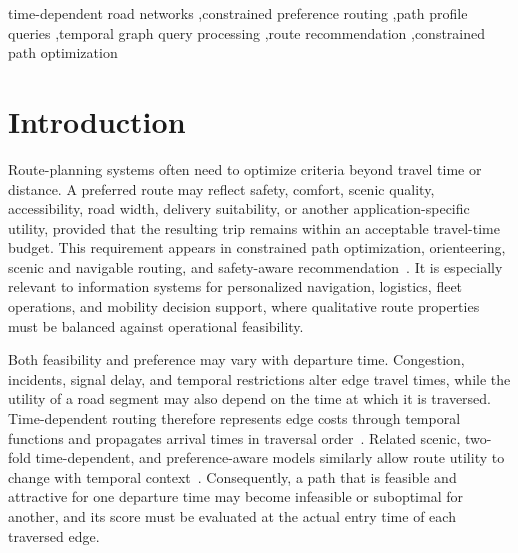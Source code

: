 \documentclass[a4paper,fleqn]{cas-dc}
\begin{document}
\begin{keywords}
time-dependent road networks
\sep constrained preference routing
\sep path profile queries
\sep temporal graph query processing
\sep route recommendation
\sep constrained path optimization
\end{keywords}

\maketitle

\section{Introduction}
\label{sec:introduction}

Route-planning systems often need to optimize criteria beyond travel time or distance. A preferred route may reflect safety, comfort, scenic quality, accessibility, road width, delivery suitability, or another application-specific utility, provided that the resulting trip remains within an acceptable travel-time budget. This requirement appears in constrained path optimization, orienteering, scenic and navigable routing, and safety-aware recommendation~\cite{joksch1966shortest,handler1980dual,golden1987orienteering,vansteenwegen2011orienteering,Gunawan2016OPSurvey,Lu2015Scenic,Kaur2021Navigable,Aljubayrin2015SafeZones,Islam2023PersonalizedSafe}. It is especially relevant to information systems for personalized navigation, logistics, fleet operations, and mobility decision support, where qualitative route properties must be balanced against operational feasibility.

Both feasibility and preference may vary with departure time. Congestion, incidents, signal delay, and temporal restrictions alter edge travel times, while the utility of a road segment may also depend on the time at which it is traversed. Time-dependent routing therefore represents edge costs through temporal functions and propagates arrival times in traversal order~\cite{td-djk,OrdaRom1990TDSP,GeorgeS06,GeorgeKS07,tdsp-edbt08,tdsp-2019vldb}. Related scenic, two-fold time-dependent, and preference-aware models similarly allow route utility to change with temporal context~\cite{lu2017scenic,Chen2019MostBeautiful,Chen2021TwoTDPathPlanner,dutta2024tdcpo}. Consequently, a path that is feasible and attractive for one departure time may become infeasible or suboptimal for another, and its score must be evaluated at the actual entry time of each traversed edge.
\end{document}
